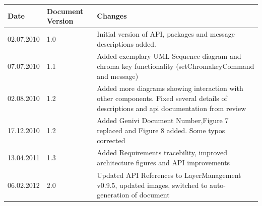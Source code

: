 \documentclass[a4paper]{article}
\begin{document}
\begin{titlepage}
\begin{tabular}{ | l | l | p{9.5cm} | }
\hline
Date & Document Version & Changes \\
\hline
02.07.2010 & 1.0 & Initial version of API, packages and message descriptions added. \\
\hline
07.07.2010 & 1.1 & Added exemplary UML Sequence diagram and chroma key functionality (setChromakeyCommand and message) \\
\hline
02.08.2010 & 1.2 & Added more diagrams showing interaction with other components. Fixed several details of descriptions and api documentation from review \\
\hline
17.12.2010 & 1.2 & Added Genivi Document Number,Figure 7 replaced and Figure 8 added. Some typos corrected \\
\hline
13.04.2011 & 1.3 & Added Requirements tracebility, improved architecture figures and API improvements \\
\hline
06.02.2012 & 2.0 & Updated API References to LayerManagement v0.9.5, updated images, switched to auto-generation of document \\
\hline
\end{tabular}


\end{titlepage}
\clearemptydoublepage
{}
\tableofcontents
\clearemptydoublepage
{}
\hypersetup{pageanchor=true}
\end{document}
